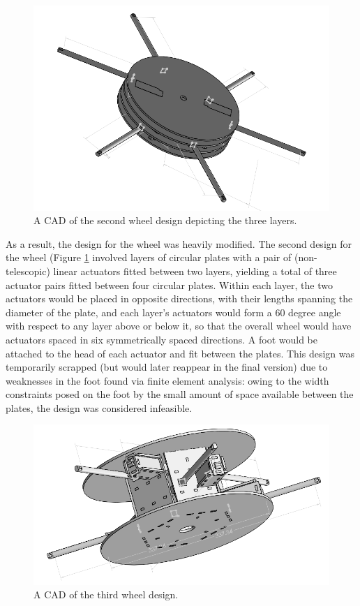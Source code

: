 \documentclass[12pt]{article}
\numberwithin{figure}{section}
\begin{document}
\begin{multicols}{2}
\begin{figure}[H]
\includegraphics[scale=0.3]{Second_Design.png}
\caption{A CAD of the second wheel design depicting the three layers.}
\label{fig:second_design}
\end{figure}

As a result, the design for the wheel was heavily modified. The second design for the wheel (Figure \ref{fig:second_design} involved layers of circular plates with a pair of (non-telescopic) linear actuators fitted between two layers, yielding a total of three actuator pairs fitted between four circular plates. Within each layer, the two actuators would be placed in opposite directions, with their lengths spanning the diameter of the plate, and each layer’s actuators would form a 60 degree angle with respect to any layer above or below it, so that the overall wheel would have actuators spaced in six symmetrically spaced directions. A foot would be attached to the head of each actuator and fit between the plates. This design was temporarily scrapped (but would later reappear in the final version) due to weaknesses in the foot found via finite element analysis: owing to the width constraints posed on the foot by the small amount of space available between the plates, the design was considered infeasible.

\begin{figure}[H]
\includegraphics[scale=0.3]{Third_Design.png}
\caption{A CAD of the third wheel design.}
\label{fig:third_design}
\end{figure}


\end{multicols}
\end{document}
